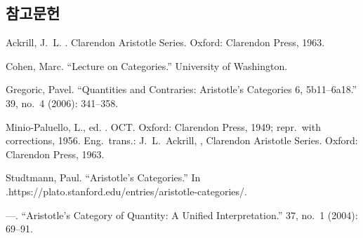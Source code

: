 \documentclass[12pt, a4paper]{article}
\begin{document}
\subsection*{참고문헌}
\begin{references}

 Ackrill, J.\ L. . Clarendon Aristotle Series. Oxford: Clarendon Press, 1963.

 Cohen, Marc. ``Lecture on Categories.'' University of Washington.

 Gregoric, Pavel. ``Quantities and Contraries: Aristotle's Categories 6, 5b11--6a18.''  39, no.\ 4 (2006): 341--358.

 Minio-Paluello, L., ed. . OCT. Oxford: Clarendon Press, 1949; repr.\ with corrections, 1956. Eng.\ trans.: J.\ L.\ Ackrill, , Clarendon Aristotle Series. Oxford: Clarendon Press, 1963.

 Studtmann, Paul. ``Aristotle's Categories.'' In .\newline https://plato.stanford.edu/entries/aristotle-categories/.

 ---. ``Aristotle's Category of Quantity: A Unified Interpretation.''  37, no.\ 1 (2004): 69--91.

\end{references}
\end{document}
